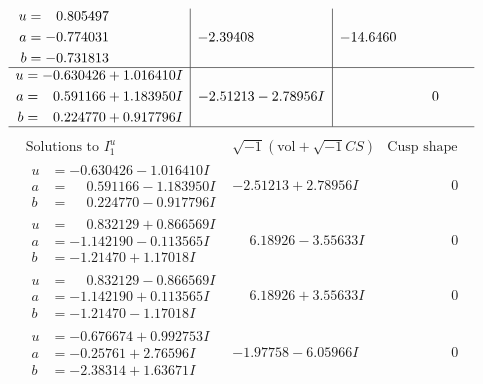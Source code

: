\documentclass[1p]{elsarticle_modified}
\theoremstyle{definition}
\newcommand{\I}{\sqrt{-1}}
\begin{document}
$$\begin{array}{c|c|c}
\begin{aligned}
u &= \phantom{-}0.805497\phantom{ +0.000000I} \\
a &= -0.774031\phantom{ +0.000000I} \\
b &= -0.731813\phantom{ +0.000000I}\end{aligned}
 & -2.39408\phantom{ +0.000000I} & -14.6460\phantom{ +0.000000I} \\ \hline\begin{aligned}
u &= -0.630426 + 1.016410 I \\
a &= \phantom{-}0.591166 + 1.183950 I \\
b &= \phantom{-}0.224770 + 0.917796 I\end{aligned}
 & -2.51213 - 2.78956 I & \phantom{-0.000000 } 0\\
 \hline 
 \end{array}$$\newpage$$\begin{array}{c|c|c}  
\text{Solutions to }I^u_{1}& \I (\text{vol} + \sqrt{-1}CS) & \text{Cusp shape}\\
 \hline 
\begin{aligned}
u &= -0.630426 - 1.016410 I \\
a &= \phantom{-}0.591166 - 1.183950 I \\
b &= \phantom{-}0.224770 - 0.917796 I\end{aligned}
 & -2.51213 + 2.78956 I & \phantom{-0.000000 } 0 \\ \hline\begin{aligned}
u &= \phantom{-}0.832129 + 0.866569 I \\
a &= -1.142190 - 0.113565 I \\
b &= -1.21470 + 1.17018 I\end{aligned}
 & \phantom{-}6.18926 - 3.55633 I & \phantom{-0.000000 } 0 \\ \hline\begin{aligned}
u &= \phantom{-}0.832129 - 0.866569 I \\
a &= -1.142190 + 0.113565 I \\
b &= -1.21470 - 1.17018 I\end{aligned}
 & \phantom{-}6.18926 + 3.55633 I & \phantom{-0.000000 } 0 \\ \hline\begin{aligned}
u &= -0.676674 + 0.992753 I \\
a &= -0.25761 + 2.76596 I \\
b &= -2.38314 + 1.63671 I\end{aligned}
 & -1.97758 - 6.05966 I & \phantom{-0.000000 } 0 \\ \hline\begin{aligned}

\end{aligned}
\end{array}$$
\end{document}
